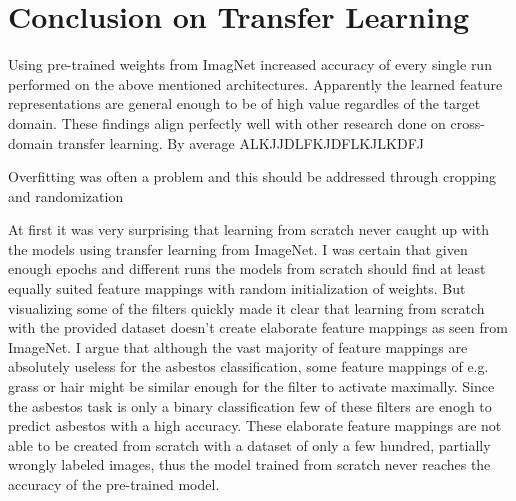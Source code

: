 \section{Conclusion on Transfer Learning}

Using pre-trained weights from ImagNet increased accuracy of every single run performed on the above mentioned architectures. Apparently the learned feature representations are general enough to be of high  value regardles of the target domain. These findings align perfectly well with other research done on cross-domain transfer learning. By average ALKJJDLFKJDFLKJLKDFJ

Overfitting was often a problem and this should be addressed through cropping and randomization

At first it was very surprising that learning from scratch never caught up with the models using transfer learning from ImageNet. I was certain that given enough epochs and different runs the models from scratch should find at least equally suited feature mappings with random initialization of weights. But visualizing  some of the filters quickly made it clear that learning from scratch  with the provided dataset doesn't create elaborate feature mappings as seen from ImageNet. I argue that although the vast majority of feature mappings are absolutely useless for the asbestos classification, some feature mappings of e.g. grass or hair might be similar enough for the filter to activate maximally. Since the asbestos task is only a binary classification few of these filters are enogh to predict asbestos with a high accuracy. These elaborate feature mappings are not able to be created from scratch with a dataset of only a few hundred, partially wrongly labeled images, thus the model trained from scratch never reaches the accuracy of the pre-trained model.

